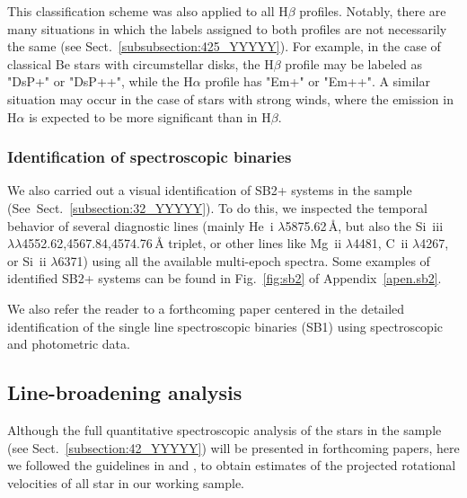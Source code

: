 \documentclass{aa}
\begin{document}
This classification scheme was also applied to all H$\beta$ profiles. Notably, there are many situations in which the labels assigned to both profiles are not necessarily the same (see Sect.~\ref{subsubsection:425_YYYYY}). For example, in the case of classical Be stars with circumstellar disks, the H$\beta$ profile may be labeled as "DsP+" or "DsP++", while the H$\alpha$ profile has "Em+" or "Em++". A similar situation may occur in the case of stars with strong winds, where the emission in H$\alpha$ is expected to be more significant than in H$\beta$.


\subsubsection{Identification of spectroscopic binaries}
\label{subsubsection:322_YYYYY}

We also carried out a visual identification of SB2+ systems in the sample (See~Sect.~\ref{subsection:32_YYYYY}). To do this, we inspected the temporal behavior of several diagnostic lines (mainly He~{\sc i} $\lambda$5875.62\,{\AA}, but also the Si~{\sc iii} $\lambda\lambda$4552.62,4567.84,4574.76\,{\AA} triplet, or other lines like Mg~{\sc ii} $\lambda$4481, C~{\sc ii} $\lambda$4267, or Si~{\sc ii} $\lambda$6371) using all the available multi-epoch spectra. Some examples of identified SB2+ systems can be found in Fig.~\ref{fig:sb2} of Appendix~\ref{apen.sb2}.

We also refer the reader to a forthcoming paper \citep{simondiaz2023} centered in the detailed identification of the single line spectroscopic binaries (SB1) using spectroscopic and photometric data.




\subsection{Line-broadening analysis}
\label{subsection:33_XXXXXX}

Although the full quantitative spectroscopic analysis of the stars in the sample (see Sect.~\ref{subsection:42_YYYYY}) will be presented in forthcoming papers, here we followed the guidelines in \citet{2014A&A...562A.135S} and \citet{2017A&A...597A..22S}, to obtain estimates of the projected rotational velocities of all star in our working sample.
\end{document}
